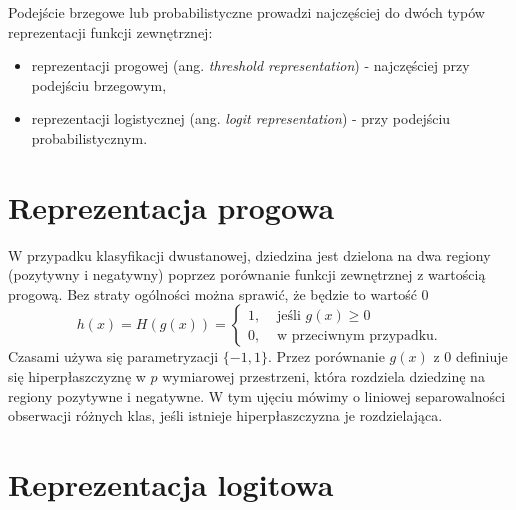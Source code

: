 \documentclass[
]{book}
\providecommand{\tightlist}{%
  \setlength{\itemsep}{0pt}\setlength{\parskip}{0pt}}
\theoremstyle{plain}
\theoremstyle{definition}
\theoremstyle{definition}
\theoremstyle{definition}
\theoremstyle{definition}
\theoremstyle{remark}
\begin{document}
Podejście brzegowe lub probabilistyczne prowadzi najczęściej do dwóch typów reprezentacji funkcji zewnętrznej:

\begin{itemize}
\tightlist
\item
  reprezentacji progowej (ang. \emph{threshold representation}) - najczęściej przy podejściu brzegowym,
\item
  reprezentacji logistycznej (ang. \emph{logit representation}) - przy podejściu probabilistycznym.
\end{itemize}

\hypertarget{reprezentacja-progowa}{%
\section{Reprezentacja progowa}\label{reprezentacja-progowa}}

W przypadku klasyfikacji dwustanowej, dziedzina jest dzielona na dwa regiony (pozytywny i negatywny) poprzez porównanie funkcji zewnętrznej z wartością progową. Bez straty ogólności można sprawić, że będzie to wartość 0
\begin{equation}
    h(x)=H(g(x))= \begin{cases}
        1, &\text{ jeśli } g(x)\geq 0\\
        0, &\text{ w przeciwnym przypadku.}
    \end{cases}
\end{equation}
Czasami używa się parametryzacji \(\{-1,1\}\).
Przez porównanie \(g(x)\) z 0 definiuje się hiperpłaszczyznę w \(p\) wymiarowej przestrzeni, która rozdziela dziedzinę na regiony pozytywne i negatywne. W tym ujęciu mówimy o liniowej separowalności obserwacji różnych klas, jeśli istnieje hiperpłaszczyzna je rozdzielająca.

\hypertarget{reprezentacja-logitowa}{%
\section{Reprezentacja logitowa}\label{reprezentacja-logitowa}}
\end{document}
